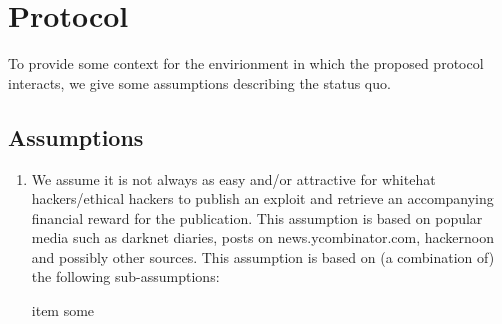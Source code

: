 \section{Protocol}
\label{sec:protocol}
To provide some context for the envirionment in which the proposed protocol interacts, we give some assumptions describing the status quo.

\subsection{Assumptions}

\begin{enumerate}
	\item We assume it is not always as easy and/or attractive for whitehat hackers/ethical hackers to publish an exploit and retrieve an accompanying financial reward for the publication. This assumption is based on popular media such as darknet diaries, posts on news.ycombinator.com, hackernoon and possibly other sources. This assumption is based on (a combination of) the following sub-assumptions:
	\begin{enumerate}
		item some
	\end{enumerate}
\end{enumerate}